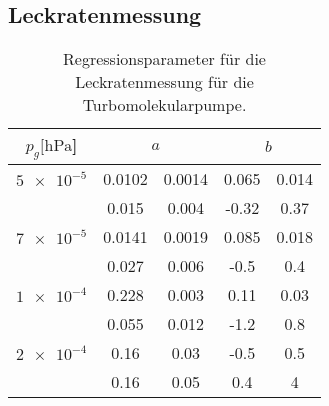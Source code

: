 \subsection{Leckratenmessung}
\begin{table}[H]
    \centering
      \caption{Regressionsparameter für die Leckratenmessung für die Turbomolekularpumpe.}
      \label{tab:Turbo_Leck_para}
      \begin{tabular}{c c @{${}\pm{}$} c c @{${}\pm{}$} c}
        \toprule
        {$p_g [\si{\hecto\pascal}$]} & \multicolumn{2}{c}{$a$} & \multicolumn{2}{c}{$b$} \\
        \midrule
        $\num{5e-5}$  & 0.0102 & 0.0014 & 0.065 & 0.014\\
                      & 0.015  & 0.004  & -0.32 & 0.37 \\
        \midrule
        $\num{7e-5}$  & 0.0141 & 0.0019 & 0.085 & 0.018\\
                      & 0.027  & 0.006  & -0.5  & 0.4  \\
        \midrule
        $\num{1e-4}$  & 0.228  & 0.003  & 0.11  & 0.03 \\
                      & 0.055  & 0.012  & -1.2  & 0.8  \\
        \midrule
        $\num{2e-4}$  & 0.16   & 0.03   & -0.5  & 0.5  \\
                      & 0.16   & 0.05   & 0.4   & 4    \\

        \bottomrule
      \end{tabular}
\end{table}

